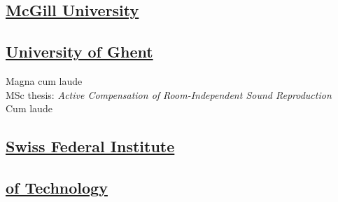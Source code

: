\documentclass[letterpaper]{deedy-resume} %
\begin{document}
{\begin{minipage}[t]{0.33\textwidth}
\subsection{\href{http://www.mcgill.ca}{McGill University}}
\sectionspace %

\subsection{\href{https://www.ugent.be}{University of Ghent}}
Magna cum laude\\
MSc thesis: \textit{Active Compensation of Room-Independent Sound Reproduction} \\

Cum laude\\
\sectionspace %

\subsection{\href{http://www.ethz.ch/}{Swiss Federal Institute}}
\subsection{\href{http://www.ethz.ch/}{of Technology}}
\sectionspace %


%



\end{minipage}}
\end{document}
